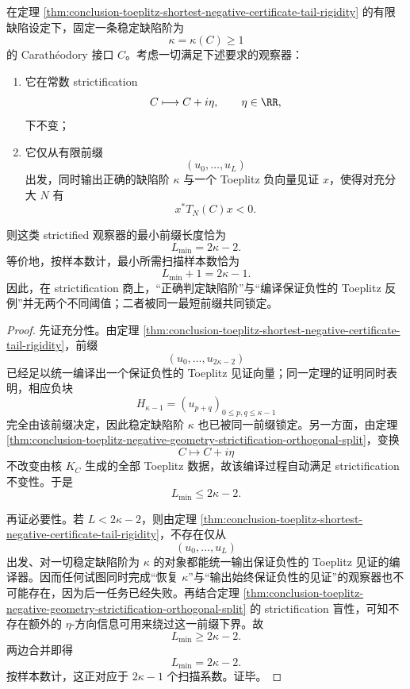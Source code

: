 \begin{theorem}\label{thm:conclusion-toeplitz-strictification-quotient-negative-certificate-threshold}
在定理 \ref{thm:conclusion-toeplitz-shortest-negative-certificate-tail-rigidity} 的有限缺陷设定下，固定一条稳定缺陷阶为
\[
\kappa=\kappa(C)\ge 1
\]
的 Carath\'eodory 接口 \(C\)。考虑一切满足下述要求的观察器：
\begin{enumerate}
  \item 它在常数 strictification
  \[
  C\longmapsto C+i\eta,
  \qquad
  \eta\in\RR,
  \]
  下不变；
  \item 它仅从有限前缀
  \[
  (u_0,\dots,u_L)
  \]
  出发，同时输出正确的缺陷阶 \(\kappa\) 与一个 Toeplitz 负向量见证 \(x\)，使得对充分大 \(N\) 有
  \[
  x^\ast T_N(C)x<0.
  \]
\end{enumerate}
则这类 strictified 观察器的最小前缀长度恰为
\[
L_{\min}=2\kappa-2.
\]
等价地，按样本数计，最小所需扫描样本数恰为
\[
L_{\min}+1=2\kappa-1.
\]
因此，在 strictification 商上，“正确判定缺陷阶”与“编译保证负性的 Toeplitz 反例”并无两个不同阈值；二者被同一最短前缀共同锁定。
\end{theorem}
\begin{proof}
先证充分性。由定理 \ref{thm:conclusion-toeplitz-shortest-negative-certificate-tail-rigidity}，前缀
\[
(u_0,\dots,u_{2\kappa-2})
\]
已经足以统一编译出一个保证负性的 Toeplitz 见证向量；同一定理的证明同时表明，相应负块
\[
H_{\kappa-1}=(u_{p+q})_{0\le p,q\le \kappa-1}
\]
完全由该前缀决定，因此稳定缺陷阶 \(\kappa\) 也已被同一前缀锁定。另一方面，由定理 \ref{thm:conclusion-toeplitz-negative-geometry-strictification-orthogonal-split}，变换
\[
C\mapsto C+i\eta
\]
不改变由核 \(K_C\) 生成的全部 Toeplitz 数据，故该编译过程自动满足 strictification 不变性。于是
\[
L_{\min}\le 2\kappa-2.
\]

再证必要性。若 \(L<2\kappa-2\)，则由定理 \ref{thm:conclusion-toeplitz-shortest-negative-certificate-tail-rigidity}，不存在仅从
\[
(u_0,\dots,u_L)
\]
出发、对一切稳定缺陷阶为 \(\kappa\) 的对象都能统一输出保证负性的 Toeplitz 见证的编译器。因而任何试图同时完成“恢复 \(\kappa\)”与“输出始终保证负性的见证”的观察器也不可能存在，因为后一任务已经失败。再结合定理 \ref{thm:conclusion-toeplitz-negative-geometry-strictification-orthogonal-split} 的 strictification 盲性，可知不存在额外的 \(\eta\)-方向信息可用来绕过这一前缀下界。故
\[
L_{\min}\ge 2\kappa-2.
\]
两边合并即得
\[
L_{\min}=2\kappa-2.
\]
按样本数计，这正对应于 \(2\kappa-1\) 个扫描系数。证毕。
\end{proof}

